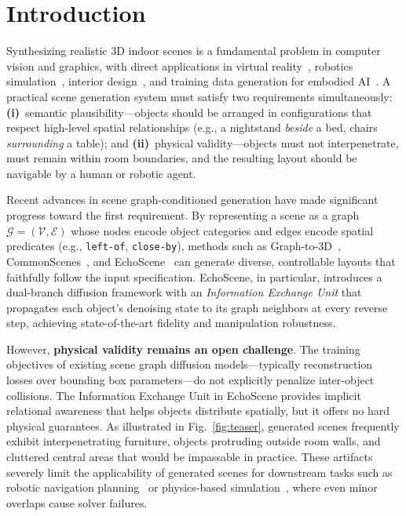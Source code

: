 \section{Introduction}
\label{sec:intro}

Synthesizing realistic 3D indoor scenes is a fundamental problem in computer vision and graphics, with direct applications in virtual reality~\cite{placeholder_vr}, robotics simulation~\cite{placeholder_robotics}, interior design~\cite{placeholder_interior}, and training data generation for embodied AI~\cite{placeholder_embodied}.
A practical scene generation system must satisfy two requirements simultaneously:
\textbf{(i)}~semantic plausibility---objects should be arranged in configurations that respect high-level spatial relationships (e.g., a nightstand \emph{beside} a bed, chairs \emph{surrounding} a table); and
\textbf{(ii)}~physical validity---objects must not interpenetrate, must remain within room boundaries, and the resulting layout should be navigable by a human or robotic agent.

Recent advances in scene graph-conditioned generation have made significant progress toward the first requirement.
By representing a scene as a graph $\mathcal{G} = (\mathcal{V}, \mathcal{E})$ whose nodes encode object categories and edges encode spatial predicates (e.g., \texttt{left-of}, \texttt{close-by}), methods such as Graph-to-3D~\cite{placeholder_graph2threed}, CommonScenes~\cite{placeholder_commonscenes}, and EchoScene~\cite{echoscene} can generate diverse, controllable layouts that faithfully follow the input specification.
EchoScene, in particular, introduces a dual-branch diffusion framework with an \emph{Information Exchange Unit} that propagates each object's denoising state to its graph neighbors at every reverse step, achieving state-of-the-art fidelity and manipulation robustness.

However, \textbf{physical validity remains an open challenge}.
The training objectives of existing scene graph diffusion models---typically reconstruction losses over bounding box parameters---do not explicitly penalize inter-object collisions.
The Information Exchange Unit in EchoScene provides implicit relational awareness that helps objects distribute spatially, but it offers no hard physical guarantees.
As illustrated in Fig.~\ref{fig:teaser}, generated scenes frequently exhibit interpenetrating furniture, objects protruding outside room walls, and cluttered central areas that would be impassable in practice.
These artifacts severely limit the applicability of generated scenes for downstream tasks such as robotic navigation planning~\cite{placeholder_nav_planning} or physics-based simulation~\cite{placeholder_physics_sim}, where even minor overlaps cause solver failures.

